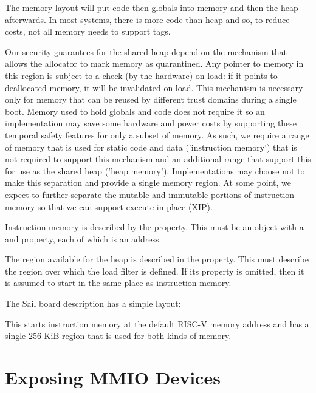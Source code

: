 The memory layout will put code then globals into memory and then the heap afterwards.
In most systems, there is more code than heap and so, to reduce costs, not all memory needs to support tags.

Our security guarantees for the shared heap depend on the mechanism that allows the allocator to mark memory as quarantined.
Any pointer to memory in this region is subject to a check (by the hardware) on load: if it points to deallocated memory, it will be invalidated on load.
This mechanism is necessary only for memory that can be reused by different trust domains during a single boot.
Memory used to hold globals and code does not require it so an implementation may save some hardware and power costs by supporting these temporal safety features for only a subset of memory.
As such, we require a range of memory that is used for static code and data ('instruction memory') that is not required to support this mechanism and an additional range that  support this for use as the shared heap ('heap memory').
Implementations may choose not to make this separation and provide a single memory region.
At some point, we expect to further separate the mutable and immutable portions of instruction memory so that we can support execute in place (XIP).

Instruction memory is described by the  property.
This must be an object with a  and  property, each of which is an address.

The region available for the heap is described in the  property.
This must describe the region over which the load filter is defined.
If its  property is omitted, then it is assumed to start in the same place as instruction memory.

The Sail board description has a simple layout:

\begin{jsonsnippet}
    "instruction_memory": {
        "start": 0x80000000,
        "end": 0x80040000
    \},
    "heap": {
        "end": 0x80040000
    \},
\end{jsonsnippet}

This starts instruction memory at the default RISC-V memory address and has a single 256 KiB region that is used for both kinds of memory.

\section{Exposing MMIO Devices}

